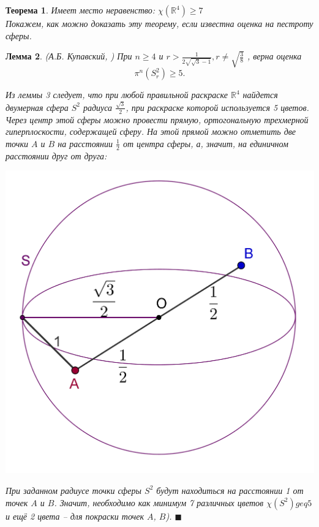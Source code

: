 \documentclass{report}%
\newtheorem{theorem}{Теорема}
\newtheorem{lemma}[theorem]{Лемма}
\newenvironment{proof}{\par\noindent{\bf Доказательство.}}{\hfill$\scriptstyle\blacksquare$}
\begin{document}
\begin{theorem}
		Имеет место неравенство: $\chi(\mathbb{R}^4) \geq 7$ \\
		Покажем, как можно доказать эту теорему, если известна оценка на пестроту сферы.
\end{theorem}

\begin{lemma} (А.Б. Купавский, \cite{Kupavsky2011})
		При $n \geq 4$ и $r > \frac{1}{2\sqrt{\sqrt{3}-1}}, r \ne \sqrt{\frac{3}{8}}$ , верна оценка
		\begin{equation}
				\pi^n(S_r^2) \geq 5.
		\end{equation}
		
		\begin{proof}
				Из леммы 3 следует, что при любой правильной раскраске $\mathbb{R}^4$
				найдется двумерная сфера $S^2$ радиуса $\frac{\sqrt{3}}{2}$, при раскраске которой используется 5 цветов.
				Через центр этой сферы можно провести прямую, ортогональную трехмерной гиперплоскости, содержащей сферу.
				На этой прямой можно отметить две точки $A$ и $B$ на расстоянии $\frac{1}{2}$ от центра сферы, а,
				значит, на единичном расстоянии друг от друга: \\
				\begin{center}
						\includegraphics[scale = 0.25]{R4}
				\end{center}
				
				При заданном радиусе точки сферы $S^2$ будут находиться на расстоянии 1 от точек $A$ и $B$.
				Значит, необходимо как минимум 7 различных цветов $\chi(S^2) geq 5$ и ещё 2 цвета – для покраски точек $A$, $B$). 
		\end{proof}
\end{lemma}
\end{document}
